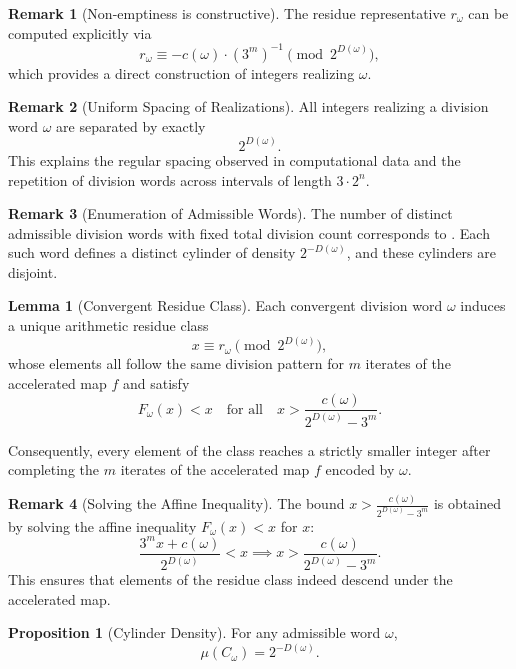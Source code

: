 \documentclass[12pt, oneside]{article}   	%
\numberwithin{equation}{section}          %
\theoremstyle{definition}
\newtheorem{proposition}{Proposition}[section]
\newtheorem{lemma}[theorem]{Lemma}
\newtheorem*{remark}{Remark}
\begin{document}
\begin{remark}[Non-emptiness is constructive]
The residue representative $r_\omega$ can be computed explicitly via
\[
r_\omega \equiv -c(\omega)\cdot (3^m)^{-1} \pmod{2^{D(\omega)}},
\]
which provides a direct construction of integers realizing $\omega$.
\end{remark}

\begin{remark}[Uniform Spacing of Realizations]
\label{rem:spacing}
All integers realizing a division word $\omega$ are separated by exactly
\[
2^{D(\omega)}.
\]
This explains the regular spacing observed in computational data and
the repetition of division words across intervals of length $3 \cdot 2^n$.
\end{remark}

\begin{remark}[Enumeration of Admissible Words]
The number of distinct admissible division words with fixed total division
count corresponds to . Each such word defines a distinct
cylinder of density $2^{-D(\omega)}$, and these cylinders are disjoint.
\end{remark}

\begin{lemma}[Convergent Residue Class]
\label{lem:residue-class}
Each convergent division word $\omega$ induces a unique arithmetic residue class
\[
x \equiv r_\omega \pmod{2^{D(\omega)}},
\]
whose elements all follow the same division pattern for $m$ iterates of the
accelerated map $f$ and satisfy
\[
F_\omega(x) < x
\quad\text{for all}\quad
x > \frac{c(\omega)}{2^{D(\omega)} - 3^m}.
\]

Consequently, every element of the class reaches a strictly smaller integer
after completing the $m$ iterates of the accelerated map $f$ encoded by $\omega$.
\end{lemma}

\begin{remark}[Solving the Affine Inequality]
The bound 
\(\displaystyle x > \frac{c(\omega)}{2^{D(\omega)} - 3^m}\)
is obtained by solving the affine inequality \(F_\omega(x) < x\) for \(x\):
\[
\frac{3^m x + c(\omega)}{2^{D(\omega)}} < x \implies x > \frac{c(\omega)}{2^{D(\omega)} - 3^m}.
\]
This ensures that elements of the residue class indeed descend under the accelerated map.
\end{remark}

\begin{proposition}[Cylinder Density]
For any admissible word $\omega$,
\[
\mu(C_\omega) = 2^{-D(\omega)}.
\]
\end{proposition}
\end{document}
